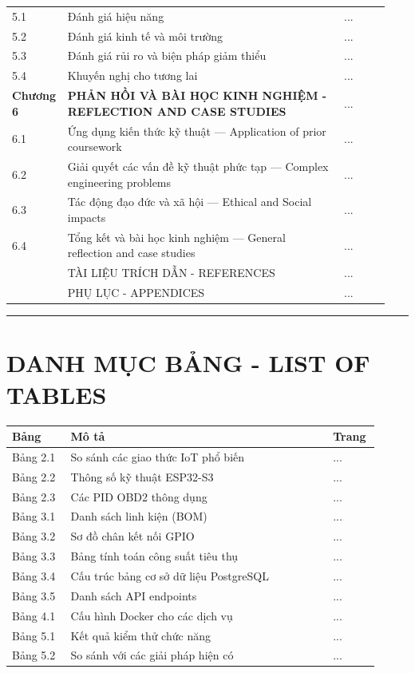 \documentclass[13pt,a4paper]{extarticle}
\newcounter{none} %
\newcommand{\thesislongtableorignewline}{}
\let\thesislongtableorignewline\\
\renewcommand{\\}{\thesislongtableorignewline\hline}%
\let\\\thesislongtableorignewline
\newcommand{\majorheading}[1]{\clearpage\section*{#1}}
\begin{document}
{\begin{longtable}{|C{0.10\linewidth}|L{0.72\linewidth}|C{0.12\linewidth}|}
5.1 & Đánh giá hiệu năng & ... \\
5.2 & Đánh giá kinh tế và môi trường & ... \\
5.3 & Đánh giá rủi ro và biện pháp giảm thiểu & ... \\
5.4 & Khuyến nghị cho tương lai & ... \\
\textbf{Chương 6} & \textbf{PHẢN HỒI VÀ BÀI HỌC KINH NGHIỆM - REFLECTION
AND CASE STUDIES} & ... \\
6.1 & Ứng dụng kiến thức kỹ thuật --- Application of prior coursework & ... \\
6.2 & Giải quyết các vấn đề kỹ thuật phức tạp --- Complex engineering
problems & ... \\
6.3 & Tác động đạo đức và xã hội --- Ethical and Social impacts & ... \\
6.4 & Tổng kết và bài học kinh nghiệm --- General reflection and
case studies & ... \\
& TÀI LIỆU TRÍCH DẪN - REFERENCES & ... \\
& PHỤ LỤC - APPENDICES & ... \\
\end{longtable}
}

\begin{center}\rule{0.5\linewidth}{0.5pt}\end{center}

\majorheading{DANH MỤC BẢNG - LIST OF TABLES}\label{danh-mux1ee5c-bux1ea3ng---list-of-tables}

{\def\LTcaptype{none} %
\begin{longtable}{|C{0.15\linewidth}|L{0.67\linewidth}|C{0.12\linewidth}|}
\hline \textbf{} \textbf{Bảng} & \textbf{Mô tả} & \textbf{Trang} \\
\hline
\endhead
\hline
\endlastfoot
Bảng 2.1 & So sánh các giao thức IoT phổ biến & ... \\
Bảng 2.2 & Thông số kỹ thuật ESP32-S3 & ... \\
Bảng 2.3 & Các PID OBD2 thông dụng & ... \\
Bảng 3.1 & Danh sách linh kiện (BOM) & ... \\
Bảng 3.2 & Sơ đồ chân kết nối GPIO & ... \\
Bảng 3.3 & Bảng tính toán công suất tiêu thụ & ... \\
Bảng 3.4 & Cấu trúc bảng cơ sở dữ liệu PostgreSQL & ... \\
Bảng 3.5 & Danh sách API endpoints & ... \\
Bảng 4.1 & Cấu hình Docker cho các dịch vụ & ... \\
Bảng 5.1 & Kết quả kiểm thử chức năng & ... \\
Bảng 5.2 & So sánh với các giải pháp hiện có & ... \\
\end{longtable}
}
\end{document}
